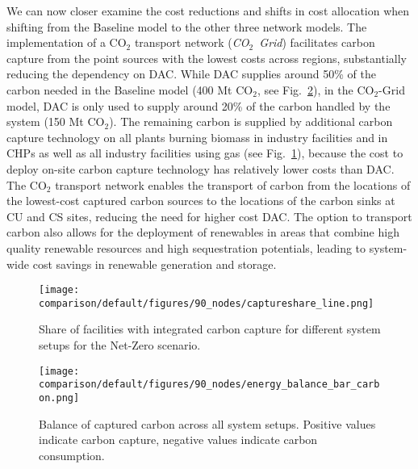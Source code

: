 \documentclass[twocolumn]{article}
\newcommand{\carbon}{CO$_2$}
\newcommand{\modCO}{CO$_2$-Grid model}
\begin{document}
We can now closer examine the cost reductions and shifts in cost allocation when shifting from the Baseline model to the other three network models.
The implementation of a \carbon{} transport network (\textit{\carbon{}~Grid}) facilitates carbon capture from the point sources with the lowest costs across regions, substantially reducing the dependency on DAC. While DAC supplies around 50\% of the carbon needed in the Baseline model (400 Mt \carbon{}, see Fig.~\ref{fig:balance_captured_carbon}), in the \modCO{}, DAC is only used to supply around 20\% of the carbon handled by the system (150 Mt \carbon{}). The remaining carbon is supplied by additional carbon capture technology on all plants burning biomass in industry facilities and in CHPs as well as all industry facilities using gas (see Fig.~\ref{fig:captureshare_line}), because the cost to deploy on-site carbon capture technology has relatively lower costs than DAC. The \carbon{} transport network enables the transport of carbon from the locations of the lowest-cost captured carbon sources to the locations of the carbon sinks at CU and CS sites, reducing the need for higher cost DAC. The option to transport carbon also allows for the deployment of renewables in areas that combine high quality renewable resources and high sequestration potentials, leading to system-wide cost savings in renewable generation and storage.


\begin{figure}[h]
    \centering
    \texttt{[image: comparison/default/figures/90\_nodes/captureshare\_line.png]}
    \caption{Share of facilities with integrated carbon capture for different system setups for the Net-Zero scenario.}
    \label{fig:captureshare_line}
\end{figure}%

\begin{figure}[ht!]
    \centering
    \texttt{[image: comparison/default/figures/90\_nodes/energy\_balance\_bar\_carbon.png]}
    \caption{Balance of captured carbon across all system setups. Positive values indicate carbon capture, negative values indicate carbon consumption.}
    \label{fig:balance_captured_carbon}
\end{figure}
\end{document}
